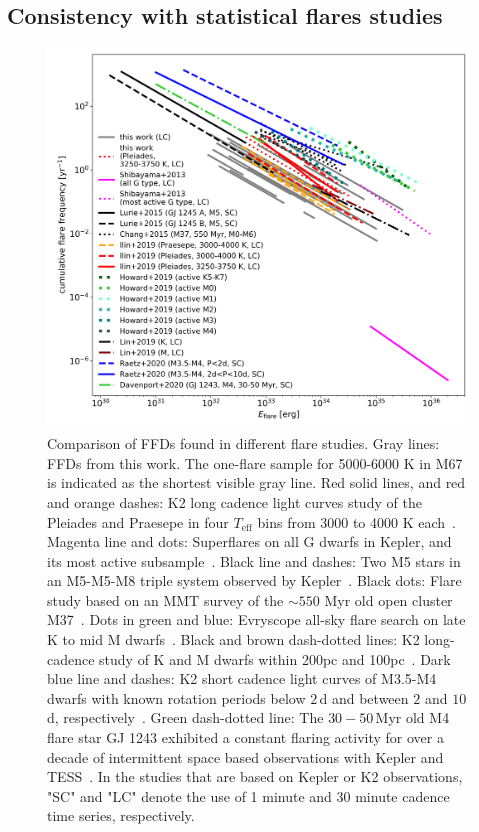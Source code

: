 \documentclass{aa}
\begin{document}
\subsection{Consistency with statistical flares studies}
\label{sec:consistency_other_work}
\begin{figure}[ht!]
    \centering
    \includegraphics[width=13.5cm]{pics/FFDs/discussion_FFDs.png}
    \caption{Comparison of FFDs found in different flare studies. Gray lines: FFDs from this work. The one-flare sample for 5000-6000 K in M67 is indicated as the shortest visible gray line. Red solid lines, and red and orange dashes: K2 long cadence light curves study of the Pleiades and Praesepe in four $T_\mathrm{eff}$ bins from 3000 to 4000 K each~. Magenta line and dots: Superflares on all G dwarfs in Kepler, and its most active subsample~\citep{shibayama2013}. Black line and dashes: Two M5 stars in an M5-M5-M8 triple system observed by Kepler~\citep{lurie2015}. Black dots: Flare study based on an MMT survey of the $\sim550$ Myr old open cluster M37~\citep{chang2015}. Dots in green and blue: Evryscope all-sky flare search on late K to mid M dwarfs~\citep{howard2019}. Black and brown dash-dotted lines: K2 long-cadence study of K and M dwarfs within 200pc and 100pc~\citep{lin2019}. Dark blue line and dashes: K2 short cadence light curves of M3.5-M4 dwarfs with known rotation periods below $2\,$d and between $2$ and $10\,$d, respectively~\citep{raetz2020}. Green dash-dotted line: The $30-50$\,Myr old M4 flare star GJ 1243 exhibited a constant flaring activity for over a decade of intermittent space based observations with Kepler and TESS~\citep{davenport2020arxiv}. In the studies that are based on Kepler or K2 observations, "SC" and "LC" denote the use of 1 minute and 30 minute cadence time series, respectively.}      
    \label{fig:otherwork}
\end{figure}
\end{document}
